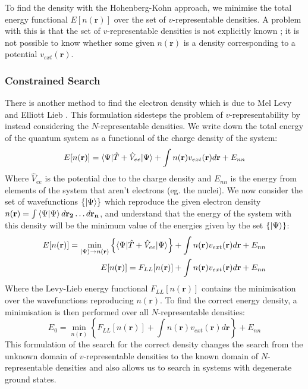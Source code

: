 \documentclass[12pt]{article}
\begin{document}
To find the density with the Hohenberg-Kohn approach, we minimise the total energy functional $E[n(\mathbf r)]$ over the set of $v$-representable densities. A problem with this is that the set of $v$-representable densities is not explicitly known \cite{GONIS201623}; it is not possible to know whether some given $n(\mathbf r)$ is a density corresponding to a potential $v_{ext}(\mathbf r)$.

\subsubsection{Constrained Search}
There is another method to find the electron density which is due to Mel Levy \cite{Levy6062} and Elliott Lieb \cite{lieb1985density}. This formulation sidesteps the problem of $v$-representability by instead considering the $N$-representable densities.
We write down the total energy of the quantum system as a functional of the charge density of the system:
\begin{equation}
	E[n(\mathbf r)] = \braket{\Psi|\hat T + \hat V_{ee}|\Psi} + \int n(\mathbf r)v_{ext}(\mathbf r)d\mathbf r + E_{nn}
\end{equation}
Where $\hat V_{ee}$ is the potential due to the charge density and $E_{nn}$ is the energy from elements of the system that aren't electrons (eg. the nuclei). 
We now consider the set of wavefunctions $\left\{\ket{\Psi}\right\}$ which reproduce the given electron density $n(\mathbf r)=\int \braket{\Psi|\Psi}d\mathbf{r_2}\mathellipsis d\mathbf{r_n}$, and understand that the energy of the system with this density will be the minimum value of the energies given by the set $\left\{\ket{\Psi}\right\}$:
\begin{equation}
\begin{split}
E[n(\mathbf r)] = \min_{\ket{\Psi} \rightarrow n(\mathbf r)}\left\{\braket{\Psi | \hat T + \hat V_{ee} | \Psi}\right\} + \int n(\mathbf r) v_{ext}(\mathbf r) d \mathbf r + E_{nn}\\
E[n(\mathbf r)] = F_{LL}[n(\mathbf r)] + \int n(\mathbf r) v_{ext}(\mathbf r) d\mathbf r + E_{nn}
\end{split}
\end{equation}
Where the Levy-Lieb energy functional $F_{LL}[n(\mathbf r)]$ contains the minimisation over the wavefunctions reproducing $n(\mathbf r)$.
To find the correct energy density, a minimisation is then performed over all $N$-representable densities:
\begin{equation}\label{eq:levylieb}
 E_0 = \min_{n(\mathbf r)} \left\{ F_{LL}[n(\mathbf r)] + \int n(\mathbf r) v_{ext}(\mathbf r) d \mathbf r\right\} + E_{nn}
\end{equation}
This formulation of the search for the correct density changes the search from the unknown domain of $v$-representable densities to the known domain of $N$-representable densities and also allows us to search in systems with degenerate ground states. 
\end{document}
